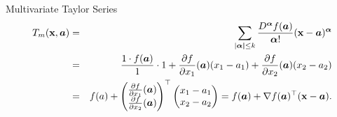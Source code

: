 \begin{vbframe}{Multivariate Taylor Series}
\begin{eqnarray*}
  T_m(\mathbf{x},\bm{a}) &=& \sum_{|\bm{\alpha|} \le k} \frac{D^{\bm\alpha} f(\bm{a})}{\bm{\alpha}!} (\mathbf{x} - \bm{a})^{\bm{\alpha}} \\ &=& \frac{1 \cdot f(\bm{a})}{1} \cdot 1 + \frac{\partial f}{\partial x_1}(\bm{a}) (x_1 - a_1) + \frac{\partial f}{\partial x_2}(\bm{a}) (x_2 - a_2) \\
  &=& f(a) + \begin{pmatrix} \frac{\partial f}{\partial x_1} (\bm{a})\\ \frac{\partial f}{\partial x_2}(\bm{a})\end{pmatrix}^\top \begin{pmatrix} x_1 - a_1 \\ x_2 - a_2\end{pmatrix} = f(\bm{a}) + \nabla f(\bm{a})^\top (\mathbf{x} - \bm{a}). 
\end{eqnarray*}


\end{vbframe}



  \endlecture

